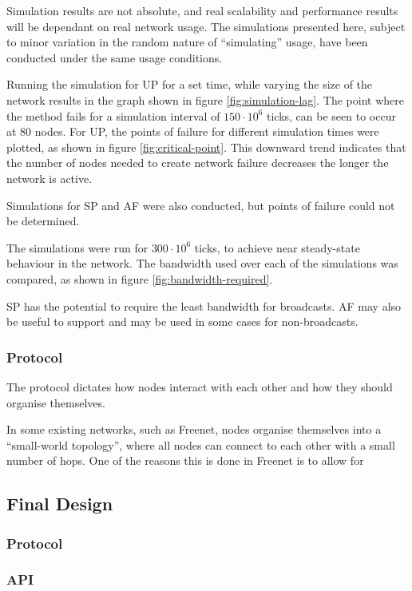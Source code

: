 			Simulation results are not absolute, and real scalability and performance results will be dependant on real network usage. The simulations presented here, subject to minor variation in the random nature of ``simulating'' usage, have been conducted under the same usage conditions.
			
			Running the simulation for UP for a set time, while varying the size of the network results in the graph shown in figure \ref{fig:simulation-lag}. The point where the method fails for a simulation interval of $150\cdot10^6$ ticks, can be seen to occur at 80 nodes. For UP, the points of failure for different simulation times were plotted, as shown in figure \ref{fig:critical-point}. This downward trend indicates that the number of nodes needed to create network failure decreases the longer the network is active.
			
			Simulations for SP and AF were also conducted, but points of failure could not be determined.
			
			The simulations were run for $300\cdot10^6$ ticks, to achieve near steady-state behaviour in the network. 
			The bandwidth used over each of the simulations was compared, as shown in figure \ref{fig:bandwidth-required}.
			
			SP has the potential to require the least bandwidth for broadcasts. AF may also be useful to support and may be used in some cases for non-broadcasts.
			
		
		\subsubsection{Protocol}
			The protocol dictates how nodes interact with each other and how they should organise themselves.
			
			In some existing networks, such as Freenet, nodes organise themselves into a ``small-world topology'', where all nodes can connect to each other with a small number of hops. One of the reasons this is done in Freenet is to allow for 

			
	\subsection{Final Design}
		\subsubsection{Protocol}
			
		\subsubsection{API}